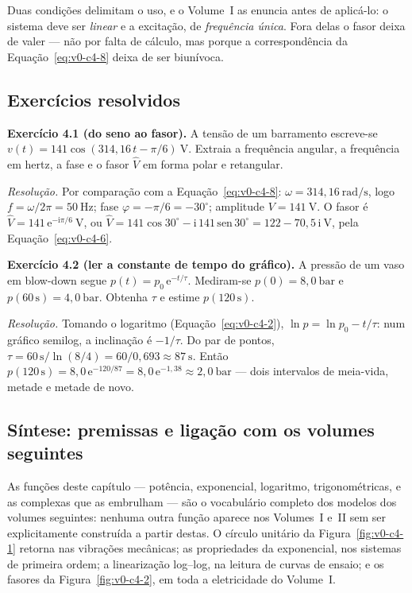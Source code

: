 \documentclass[12pt,a4paper]{article}
\numberwithin{equation}{section}
\numberwithin{table}{section}
\numberwithin{figure}{section}
\begin{document}
Duas condições delimitam o uso, e o Volume~I as enuncia antes de aplicá-lo:
o sistema deve ser \emph{linear} e a excitação, de \emph{frequência única}.
Fora delas o fasor deixa de valer --- não por falta de cálculo, mas porque a
correspondência da Equação~\eqref{eq:v0-c4-8} deixa de ser biunívoca.

\subsection{Exercícios resolvidos}

\textbf{Exercício 4.1 (do seno ao fasor).} A tensão de um barramento
escreve-se $v(t) = 141\cos(314{,}16\,t - \pi/6)\ \mathrm{V}$. Extraia a
frequência angular, a frequência em hertz, a fase e o fasor
$\hat{V}$ em forma polar e retangular.

\emph{Resolução.} Por comparação com a Equação~\eqref{eq:v0-c4-8}:
$\omega = 314{,}16\ \mathrm{rad/s}$, logo $f = \omega/2\pi = 50\ \mathrm{Hz}$;
fase $\varphi = -\pi/6 = -30^\circ$; amplitude $V = 141\ \mathrm{V}$.
O fasor é $\hat{V} = 141\,\mathrm{e}^{-\mathrm{i}\pi/6}\ \mathrm{V}$, ou
$\hat{V} = 141\cos 30^\circ - \mathrm{i}\,141\,\mathrm{sen}\,30^\circ
= 122 - 70{,}5\,\mathrm{i}\ \mathrm{V}$, pela Equação~\eqref{eq:v0-c4-6}.

\textbf{Exercício 4.2 (ler a constante de tempo do gráfico).} A pressão de
um vaso em blow-down segue $p(t) = p_0\,\mathrm{e}^{-t/\tau}$. Mediram-se
$p(0) = 8{,}0\ \mathrm{bar}$ e $p(60\,\mathrm{s}) = 4{,}0\ \mathrm{bar}$.
Obtenha $\tau$ e estime $p(120\,\mathrm{s})$.

\emph{Resolução.} Tomando o logaritmo (Equação~\eqref{eq:v0-c4-2}),
$\ln p = \ln p_0 - t/\tau$: num gráfico semilog, a inclinação é
$-1/\tau$. Do par de pontos, $\tau = 60\,\mathrm{s}/\ln(8/4) =
60/0{,}693 \approx 87\ \mathrm{s}$. Então
$p(120\,\mathrm{s}) = 8{,}0\,\mathrm{e}^{-120/87} =
8{,}0\,\mathrm{e}^{-1{,}38} \approx 2{,}0\ \mathrm{bar}$ --- dois
intervalos de meia-vida, metade e metade de novo.

\subsection{Síntese: premissas e ligação com os volumes seguintes}

As funções deste capítulo --- potência, exponencial, logaritmo,
trigonométricas, e as complexas que as embrulham --- são o vocabulário
completo dos modelos dos volumes
seguintes: nenhuma outra função aparece nos Volumes~I e~II sem ser
explicitamente construída a partir destas. O círculo unitário da
Figura~\ref{fig:v0-c4-1} retorna nas vibrações mecânicas; as propriedades
da exponencial, nos sistemas de primeira ordem; a linearização log--log,
na leitura de curvas de ensaio; e os fasores da
Figura~\ref{fig:v0-c4-2}, em toda a eletricidade do Volume~I.
\end{document}
